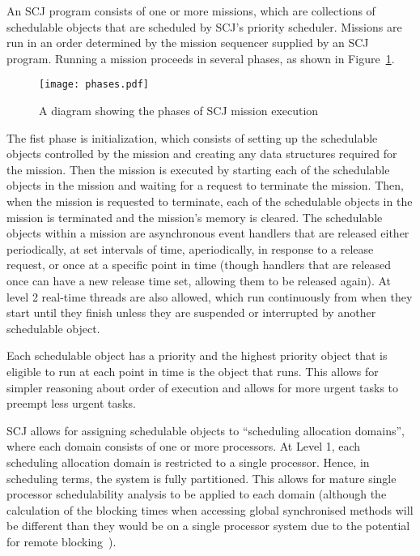 \documentclass[a4paper,10pt]{report}
\begin{document}
An SCJ program consists of one or more missions, which are collections of
schedulable objects that are scheduled by SCJ's priority scheduler. Missions are
run in an order determined by the mission sequencer supplied by an SCJ program.
Running a mission proceeds in several phases, as shown in
Figure~\ref{phases-diagram}.

\begin{figure}[ht]
\texttt{[image: phases.pdf]}
\caption{A diagram showing the phases of SCJ mission execution}
\label{phases-diagram}
\end{figure}

The fist phase is initialization, which consists of setting up the schedulable
objects controlled by the mission and creating any data structures required for
the mission.  Then the mission is executed by starting each of the schedulable
objects in the mission and waiting for a request to terminate the mission. Then,
when the mission is requested to terminate, each of the schedulable objects in
the mission is terminated and the mission's memory is cleared.  The schedulable
objects within a mission are asynchronous event handlers that are released
either periodically, at set intervals of time, aperiodically, in response to a
release request, or once at a specific point in time (though handlers that are
released once can have a new release time set, allowing them to be released
again).  At level 2 real-time threads are also allowed, which run continuously
from when they start until they finish unless they are suspended or interrupted
by another schedulable object.

Each schedulable object has a priority and the highest priority object that is
eligible to run at each point in time is the object that runs. This allows for
simpler reasoning about order of execution and allows for more urgent tasks to
preempt less urgent tasks.

SCJ allows for assigning schedulable objects to ``scheduling allocation
domains'', where each domain consists of one or more processors.  At Level 1,
each scheduling allocation domain is restricted to a single processor.  Hence,
in scheduling terms, the system is fully partitioned. This allows for mature
single processor schedulability analysis to be applied to each domain (although
the calculation of the blocking times when accessing global synchronised methods
will be different than they would be on a single processor system due to the
potential for remote blocking~\cite{davis2011}).
\end{document}
